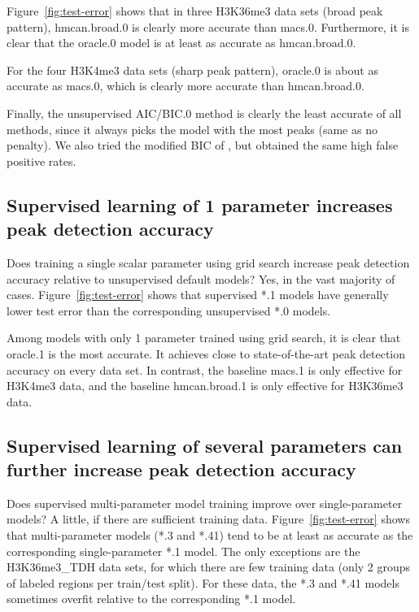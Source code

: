 \documentclass{article}
\begin{document}
Figure~\ref{fig:test-error} shows that in three H3K36me3 data sets
(broad peak pattern), hmcan.broad.0 is clearly more accurate than
macs.0. Furthermore, it is clear that the oracle.0 model is at least
as accurate as hmcan.broad.0.

For the four H3K4me3 data sets (sharp peak pattern), oracle.0 is about
as accurate as macs.0, which is clearly more accurate than
hmcan.broad.0.

Finally, the unsupervised AIC/BIC.0 method is clearly the least
accurate of all methods, since it always picks the model with the most
peaks (same as no penalty). We also tried the modified BIC of
\citet{mBIC}, but obtained the same high false positive rates.

\subsection{Supervised learning of 1 parameter increases peak
  detection accuracy}

Does training a single scalar parameter using grid search increase
peak detection accuracy relative to unsupervised default models? Yes,
in the vast majority of cases. Figure~\ref{fig:test-error} shows that
supervised *.1 models have generally lower test error than the
corresponding unsupervised *.0 models.

Among models with only 1 parameter trained using grid search, it is
clear that oracle.1 is the most accurate. It achieves close to
state-of-the-art peak detection accuracy on every data set. In
contrast, the baseline macs.1 is only effective for H3K4me3 data, and
the baseline hmcan.broad.1 is only effective for H3K36me3 data.

\subsection{Supervised learning of several parameters can further
  increase peak detection accuracy}

Does supervised multi-parameter model training improve over
single-parameter models? A little, if there are sufficient training
data. Figure~\ref{fig:test-error} shows that multi-parameter models
(*.3 and *.41) tend to be at least as accurate as the corresponding
single-parameter *.1 model. The only exceptions are the H3K36me3\_TDH
data sets, for which there are few training data (only 2 groups of
labeled regions per train/test split). For these data, the *.3 and
*.41 models sometimes overfit relative to the corresponding *.1 model.
\end{document}
